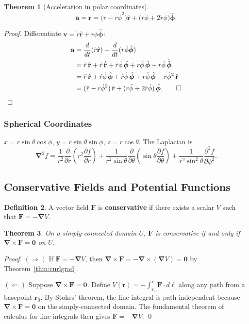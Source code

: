 \documentclass[12pt,a4paper]{article}
\theoremstyle{plain}
\newtheorem{theorem}{Theorem}[section]
\theoremstyle{definition}
\newtheorem{definition}[theorem]{Definition}
\theoremstyle{remark}
\newcommand{\ve}[1]{\mathbf{#1}}           %
\newcommand{\er}{\hat{\mathbf{r}}}
\newcommand{\ep}{\hat{\boldsymbol{\phi}}}
\newcommand{\rv}{\ve{r}}
\newcommand{\vv}{\ve{v}}
\newcommand{\av}{\ve{a}}
\newcommand{\nab}{\boldsymbol{\nabla}}
\begin{document}
\begin{theorem}[Acceleration in polar coordinates]\label{thm:polar-accel}
\[
  \av = \ddot{\rv}
  = \bigl(\ddot{r} - r\dot{\phi}^2\bigr)\er
  + \bigl(r\ddot{\phi} + 2\dot{r}\dot{\phi}\bigr)\ep.
\]
\end{theorem}
\begin{proof}
Differentiate $\vv = \dot{r}\er + r\dot{\phi}\ep$:
\begin{align*}
  \av &= \frac{d}{dt}(\dot{r}\er) + \frac{d}{dt}(r\dot{\phi}\ep) \\
      &= \ddot{r}\,\er + \dot{r}\,\dot{\er}
        + \dot{r}\dot{\phi}\,\ep + r\ddot{\phi}\,\ep + r\dot{\phi}\,\dot{\ep} \\
      &= \ddot{r}\,\er + \dot{r}\dot{\phi}\,\ep
        + \dot{r}\dot{\phi}\,\ep + r\ddot{\phi}\,\ep - r\dot{\phi}^2\,\er \\
      &= (\ddot{r}-r\dot{\phi}^2)\,\er + (r\ddot{\phi}+2\dot{r}\dot{\phi})\,\ep. \qed
\end{align*}
\end{proof}

\subsubsection{Spherical Coordinates}

$x=r\sin\theta\cos\phi$, $y=r\sin\theta\sin\phi$, $z=r\cos\theta$. The Laplacian is
\[
  \nab^2 f
  = \frac{1}{r^2}\frac{\partial}{\partial r}\!\left(r^2\frac{\partial f}{\partial r}\right)
  + \frac{1}{r^2\sin\theta}\frac{\partial}{\partial\theta}\!\left(\sin\theta\frac{\partial f}{\partial\theta}\right)
  + \frac{1}{r^2\sin^2\theta}\frac{\partial^2 f}{\partial\phi^2}.
\]

\subsection{Conservative Fields and Potential Functions}

\begin{definition}
A vector field $\ve{F}$ is \textbf{conservative} if there exists a scalar $V$ such that $\ve{F} = -\nab V$.
\end{definition}

\begin{theorem}\label{thm:conservative}
On a simply-connected domain $U$, $\ve{F}$ is conservative if and only if $\nab\times\ve{F}=\ve{0}$ on $U$.
\end{theorem}
\begin{proof}
$(\Rightarrow)$ If $\ve{F}=-\nab V$, then $\nab\times\ve{F} = -\nab\times(\nab V) = \ve{0}$ by Theorem~\ref{thm:curlgrad}.

$(\Leftarrow)$ Suppose $\nab\times\ve{F}=\ve{0}$. Define $V(\rv) = -\int_{\rv_0}^{\rv}\ve{F}\cdot d\boldsymbol\ell$ along any path from a basepoint $\rv_0$. By Stokes' theorem, the line integral is path-independent because $\nab\times\ve{F}=\ve{0}$ on the simply-connected domain. The fundamental theorem of calculus for line integrals then gives $\ve{F}=-\nab V$. \qed
\end{proof}
\end{document}
